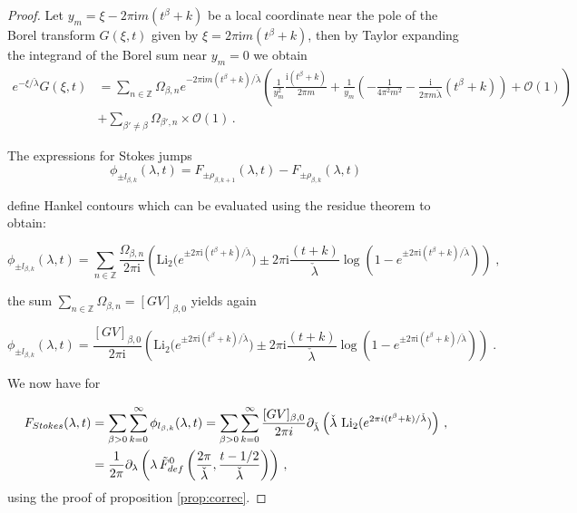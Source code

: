 \documentclass[a4paper,12pt,justification=centering]{article}
\numberwithin{equation}{section}
\newcommand{\ii}{\textnormal{i}}
\newcommand{\I}{{\mathrm i}}
\theoremstyle{plain}%
\theoremstyle{definition}
\begin{document}
\begin{proof}
Let $y_{m}=\xi-2\pi \mathrm i m(t^{\beta}+k)$ be a local coordinate near the pole of the Borel transform $G(\xi,t)$ given by $\xi=2\pi \mathrm i m (t^{\beta}+k)$, then by Taylor expanding the integrand of the Borel sum near $y_m=0$ we obtain
\begin{align}
   e^{-\xi/\check{\lambda}} G(\xi,t)&= \sum_{n\in \mathbb{Z}} \Omega_{\beta,n} e^{-2\pi \mathrm i m(t^{\beta}+k)/\check{\lambda}} \left( \frac{1}{y_m^2} \frac{\mathrm i (t^{\beta}+k)}{2\pi m}+\frac{1}{y_m}\left( - \frac{1}{4\pi^2 m^2 }- \frac{\mathrm  i}{2\pi m\check{\lambda}} (t^{\beta}+k)\right) + \mathcal{O}(1)\right)  \nonumber \\ &+   \sum_{\beta'\ne \beta}  \Omega_{\beta',n} \times \mathcal{O}(1) \,.
\end{align}


The expressions for Stokes jumps 
$$  \phi_{\pm l_{\beta,k}}(\lambda,t)=F_{\pm \rho_{\beta,k+1}}(\lambda,t)
    -F_{\pm \rho_{\beta,k}}(\lambda,t) $$
    
   define Hankel contours which can be evaluated using the residue theorem to obtain:
    
     \begin{equation}
  \phi_{\pm l_{\beta,k}}(\lambda,t) =  \sum_{n\in \mathbb{Z}} \frac{\Omega_{\beta,n}}{2\pi \I} \left( \mathrm{Li}_2\big(e^{\pm 2\pi \I(t^{\beta}+k)/\check \lambda}\big) \pm 2\pi \I \frac{(t+k)}{\check \lambda} \log \left(1- e^{\pm 2\pi \I(t^{\beta}+k)/\check \lambda} \right)\right)\;,
\end{equation}    

the sum $\sum_{n\in \mathbb{Z}} \Omega_{\beta,n} =[GV]_{\beta,0} $ yields again 

\begin{equation}
  \phi_{\pm l_{\beta,k}}(\lambda,t) = \frac{[GV]_{\beta,0}}{2\pi \I} \left( \mathrm{Li}_2\big(e^{\pm 2\pi \I(t^{\beta}+k)/\check \lambda}\big) \pm 2\pi \I \frac{(t+k)}{\check \lambda} \log \left(1- e^{\pm 2\pi \I(t^{\beta}+k)/\check \lambda} \right)\right)\;.
\end{equation}

We now have for 

\begin{align}
 F_{Stokes}(\lambda,t) &=  \sum_{\beta>0} \sum_{k=0}^{\infty} \phi_{ l_{\beta,k}}(\lambda,t) = \sum_{\beta>0}  \sum_{k=0}^{\infty} \frac{[\textrm{GV}]_{\beta,0}}{2\pi i} \partial_{\check{\lambda}} \left( \check{\lambda} \, \operatorname{Li}_2(e^{2\pi \ii (t^{\beta}+k)/\check{\lambda}})\right) \,, \nonumber\\
  &=\frac{1}{2\pi} \partial_{\lambda} \left( \lambda \, \tilde{F}^{0}_{\textrm{def}} \left( \frac{2\pi}{\check{\lambda}}, \frac{t-1/2}{\check{\lambda}} \right)\right) \,,
\end{align}
using the proof of proposition \ref{prop:correc}.


\end{proof}
\end{document}

